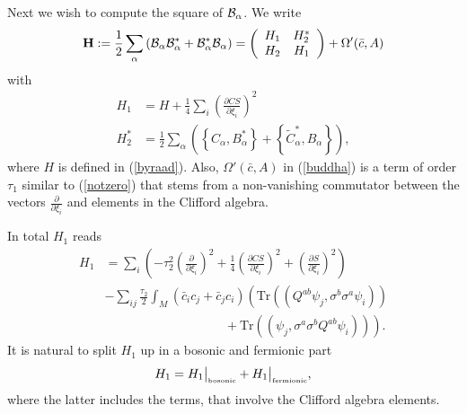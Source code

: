 \documentclass[letterpaper,11pt]{article}
\newcommand{\nn}{\nonumber}
\def\a{\alpha}
\def\OO{\Omega}
\def\cb{{\cal B}}
\newcommand{\pa}{\partial}
\begin{document}
Next we wish to compute the square of $\cb_\a$. We write 
\begin{eqnarray}
{\bf H}:= \frac{1}{2}\sum_\a \left( \cb_\a \cb_\a^*  + \cb_\a^* \cb_\a\right)  =
\left(
\begin{array}{cc}
H_{1}  & H^*_{2} \\
{H}_2 &  {H}_{1} 
\end{array}
\right) +  \OO'(\bar{c}, A)
\label{buddha}
\end{eqnarray}
with
\begin{align}
H_1 &= H + \frac{1}{4}  \sum_i \left( \frac{\pa CS}{\pa\xi_i} \right)^2
\nn\\
H_2^* &=  \frac{1}{2} \sum_\a  \left(  \left\{  C_\a   ,  B^*_\a    \right\}   +     \left\{  \tilde{C}_\a^*    ,   B_\a    \right\}     \right),
\end{align}
where $H$ is defined in (\ref{byraad}). Also, $ \OO'(\bar{c}, A)$ in (\ref{buddha}) is a term of order $\tau_1$ similar to (\ref{notzero}) that stems from a non-vanishing commutator between the vectors $\frac{\pa}{\pa\xi_i}$ and elements in the Clifford algebra.

 In total $H_1$ reads 
\begin{align}
H_1 &=  \sum_{i}    \left(  -\tau_2^2    \left( \frac{\pa}{\pa\xi_{i }}\right)^2     
+ \frac{1}{4}  \left( \frac{\pa CS}{\pa\xi_i} \right)^2  + \left( \frac{\pa S}{\pa \xi_i}\right)^2  \right)
\nn\\&
- \sum_{ij} \frac{\tau_2}{2}      \int_M \left( \bar{c}_i   {c}_{j} + \bar{c}_j   {c}_{i}  \right)  
\left( \mbox{Tr} \left(    (Q^{ab}\psi_j,  \sigma^b \sigma^a \psi_i)  \right) 
\right. \nn\\ &\left.\hspace{4cm}
+  \mbox{Tr} \left(     (\psi_j,  \sigma^a  \sigma^b Q ^{ab} \psi_i)   \right) \right).
\label{NewYork}
\end{align}
It is natural to split $H_1$ up in a bosonic and fermionic part
\begin{equation}
H_1 = H_1 \big\vert_{\mbox{\tiny bosonic}} + H_1\big\vert_{\mbox{\tiny fermionic}},
\label{Pl1}
\end{equation}
where the latter includes the terms, that involve the Clifford algebra elements.
\end{document}
